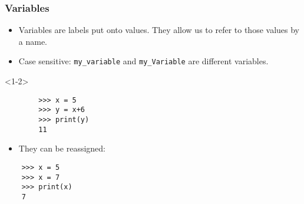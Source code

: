 \documentclass[notes]{beamer}
\begin{document}
\begin{frame}[fragile]
    \frametitle{Variables}
    \begin{itemize}
        \item Variables are labels put onto values. They allow us to refer to those values by a name.
        \pause
        \item Case sensitive: \lstinline|my_variable| and \lstinline|my_Variable| are different variables.
    \end{itemize}
    
    \begin{onlyenv}<1-2>
        \begin{lstlisting}
        >>> x = 5
        >>> y = x+6
        >>> print(y)
        11
        \end{lstlisting}
    \end{onlyenv}
    
    \pause
    
    \begin{itemize} \item They can be reassigned: \end{itemize}
    
    \begin{lstlisting}
    >>> x = 5
    >>> x = 7
    >>> print(x)
    7
    \end{lstlisting}
    
    \pause
    

\end{frame}
\end{document}

